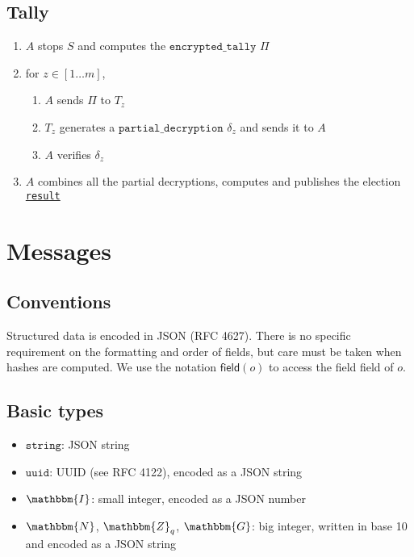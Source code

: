 \documentclass[a4paper]{article}
\newcommand{\G}{\mathbbm{G}}
\newcommand{\Z}{\mathbbm{Z}}
\newcommand{\N}{\mathbbm{N}}
\newcommand{\I}{\mathbbm{I}}
\newcommand{\jstring}{\texttt{string}}
\newcommand{\uuid}{\texttt{uuid}}
\newcommand{\etally}{\texttt{encrypted\_tally}}
\newcommand{\pdecryption}{\texttt{partial\_decryption}}
\newcommand{\result}{\texttt{result}}
\begin{document}
\subsection{Tally}

\begin{enumerate}
\item $A$ stops $S$ and computes the \hyperref[tally]{$\etally$} $\Pi$
\item for $z\in[1\dots m]$,
  \begin{enumerate}
  \item $A$ sends $\Pi$ to $T_z$
  \item $T_z$ generates a \hyperref[tally]{$\pdecryption$} $\delta_z$
    and sends it to $A$
  \item $A$ verifies $\delta_z$
  \end{enumerate}
\item $A$ combines all the partial decryptions, computes and publishes
  the election \hyperref[election-result]{\result}
\end{enumerate}

\section{Messages}
\label{messages}

\subsection{Conventions}

Structured data is encoded in JSON (RFC 4627). There is no specific
requirement on the formatting and order of fields, but care must be
taken when hashes are computed. We use the notation
$\textsf{field}(o)$ to access the field \textsf{field} of $o$.

\subsection{Basic types}
\label{basic-types}

\begin{itemize}
\item $\jstring$: JSON string
\item $\uuid$: UUID (see RFC 4122), encoded as a JSON string
\item $\I$: small integer, encoded as a JSON number
\item $\N$, $\Z_q$, $\G$: big integer, written in base 10 and encoded as a
  JSON string
\end{itemize}
\end{document}
